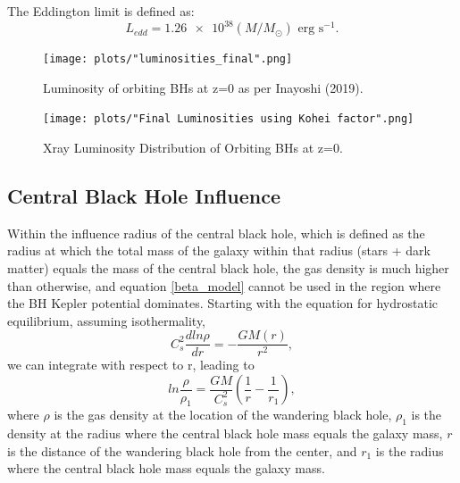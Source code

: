 \documentclass[english, backref,breaklinks,colorlinks,citecolor=blue, usenatbib]{mnras}
\begin{document}
The Eddington limit is defined as:
\begin{equation}
    L_{edd} = \num{1.26e38} (M/M_{\odot}) \text{  erg s}^{-1}.
\end{equation}


\begin{figure}[ht]
\begin{center}
\texttt{[image: plots/"luminosities\_final".png]}
\caption{Luminosity of orbiting BHs at z=0 as per Inayoshi (2019).}
\label{fig:loobhs}
\end{center}
\end{figure}

\begin{figure}
\begin{center}
\texttt{[image: plots/"Final Luminosities using Kohei factor".png]}
\caption{Xray Luminosity Distribution of Orbiting BHs at z=0.}
\label{fig:ldobhs}
\end{center}
\end{figure}


\subsection{Central Black Hole Influence}
Within the influence radius of the central black hole, which is defined as the radius at which the total mass of the galaxy within that radius (stars + dark matter) equals the mass of the central black hole, the gas density is much higher than otherwise, and equation \eqref{beta_model} cannot be used in the region where the BH Kepler potential dominates.  Starting with the equation for hydrostatic equilibrium, assuming isothermality,
\begin{equation}
    C_{s}^2\frac{dln\rho}{dr}= -\frac{GM(r)}{r^2},
\end{equation}
we can integrate with respect to r, leading to 
\begin{equation}
    ln\frac{\rho}{\rho_1} = \frac{GM}{C_{s}^2}\left(\frac{1}{r} - \frac{1}{r_1}\right),
\end{equation}
where $\rho$ is the gas density at the location of the wandering black hole, $\rho_1$ is the density at the radius where the central black hole mass equals the galaxy mass, $r$ is the distance of the wandering black hole from the center, and $r_1$ is the radius where the central black hole mass equals the galaxy mass.
\end{document}
